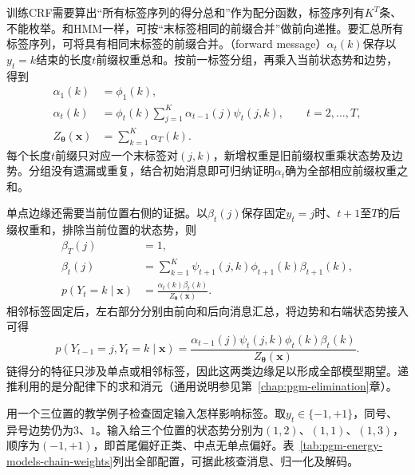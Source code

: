 训练CRF需要算出“所有标签序列的得分总和”作为配分函数，标签序列有$K^T$条、不能枚举。和HMM一样，可按“末标签相同的前缀合并”做前向递推。要汇总所有标签序列，可将具有相同末标签的前缀合并。（forward message）$\alpha_t(k)$保存以$y_t=k$结束的长度$t$前缀权重总和。按前一标签分组，再乘入当前状态势和边势，得到
\begin{equation}
  \begin{aligned}
    \alpha_1(k)&=\phi_1(k),\\
    \alpha_t(k)&=\phi_t(k)
       \sum_{j=1}^K\alpha_{t-1}(j)\psi_t(j,k),
       \qquad t=2,\ldots,T,\\
    Z_{\bm{\theta}}(\bm{x})&=\sum_{k=1}^K\alpha_T(k).
  \end{aligned}
  \label{eq:pgm-energy-models-forward}
\end{equation}
每个长度$t$前缀只对应一个末标签对$(j,k)$，新增权重是旧前缀权重乘状态势及边势。分组没有遗漏或重复，结合初始消息即可归纳证明$\alpha_t$确为全部相应前缀权重之和。

单点边缘还需要当前位置右侧的证据。以$\beta_t(j)$保存固定$y_t=j$时、$t+1$至$T$的后缀权重和，排除当前位置的状态势，则
\begin{equation}
  \begin{aligned}
    \beta_T(j)&=1,\\
    \beta_t(j)&=\sum_{k=1}^K
         \psi_{t+1}(j,k)\phi_{t+1}(k)\beta_{t+1}(k),\\
    p(Y_t=k\mid\bm{x})
      &=\frac{\alpha_t(k)\beta_t(k)}{Z_{\bm{\theta}}(\bm{x})}.
  \end{aligned}
  \label{eq:pgm-energy-models-backward}
\end{equation}
相邻标签固定后，左右部分分别由前向和后向消息汇总，将边势和右端状态势接入可得
\begin{equation}
  p(Y_{t-1}=j,Y_t=k\mid\bm{x})
   =\frac{\alpha_{t-1}(j)\psi_t(j,k)
                   \phi_t(k)\beta_t(k)}
          {Z_{\bm{\theta}}(\bm{x})}.
  \label{eq:pgm-energy-models-edge-marginal}
\end{equation}
链得分的特征只涉及单点或相邻标签，因此这两类边缘足以形成全部模型期望。递推利用的是分配律下的求和消元（通用说明参见第~\ref{chap:pgm-elimination}章）。

用一个三位置的教学例子检查固定输入怎样影响标签。取$y_t\in\{-1,+1\}$，同号、异号边势仍为$3$、$1$。输入给三个位置的状态势分别为$(1,2)$、$(1,1)$、$(1,3)$，顺序为$(-1,+1)$，即首尾偏好正类、中点无单点偏好。表~\ref{tab:pgm-energy-models-chain-weights}列出全部配置，可据此核查消息、归一化及解码。

